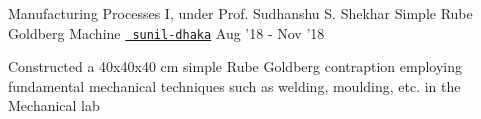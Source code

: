 \begin{cventries}
  \cventry
  {Manufacturing Processes I, under Prof. Sudhanshu S. Shekhar}
  {Simple Rube Goldberg Machine}
  {\texttt{\href{https://github.com/sunil-dhaka/}{\faGithub{} sunil-dhaka}}}
  {Aug '18 - Nov '18}
  {
    \begin{cvitems}
      \item Constructed a 40x40x40 cm simple Rube Goldberg contraption employing fundamental mechanical techniques such as welding, moulding, etc. in the Mechanical lab
    \end{cvitems}
  }
\end{cventries}
\vspace{-2mm}
